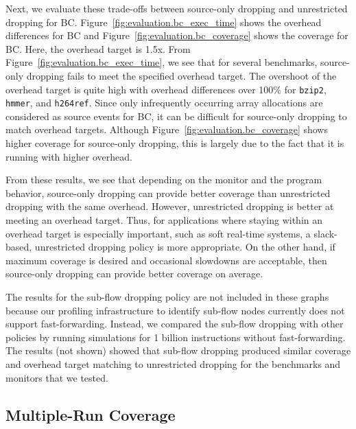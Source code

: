 Next, we evaluate these trade-offs between source-only dropping and unrestricted dropping for BC.
Figure~\ref{fig:evaluation.bc_exec_time} shows the overhead differences for BC
and Figure~\ref{fig:evaluation.bc_coverage} shows the coverage for BC.
Here, the overhead target is 1.5x.
From Figure~\ref{fig:evaluation.bc_exec_time}, we see that for several
benchmarks, source-only dropping fails to meet the specified overhead target.
The overshoot of the overhead target is quite high with overhead differences over 100\% for {\tt bzip2}, {\tt hmmer}, and {\tt h264ref}.
Since only infrequently occurring array allocations are considered as source events for BC, it can be 
difficult for source-only dropping to match overhead targets. Although
Figure~\ref{fig:evaluation.bc_coverage} shows higher coverage for
source-only dropping, this is largely due to the fact that it is running with
higher overhead.

From these results, we see that depending on the monitor and the program
behavior, source-only dropping can provide better coverage than unrestricted
dropping with the same overhead. However, unrestricted dropping is better at
meeting an overhead target.
Thus, for applications where staying within an overhead target is especially
important, such as soft real-time systems, a slack-based, unrestricted dropping
policy is more appropriate. On the other hand, if maximum coverage is desired
and occasional slowdowns are acceptable, then source-only dropping can provide
better coverage on average.

The results for the sub-flow dropping policy are not included in these graphs
because our profiling infrastructure to identify sub-flow nodes currently does
not support fast-forwarding. Instead, we compared the sub-flow dropping with
other policies by running simulations for 1 billion instructions without
fast-forwarding. The results (not shown) showed that sub-flow dropping produced
similar coverage and overhead target matching to unrestricted dropping for the
benchmarks and monitors that we tested.

\subsection{Multiple-Run Coverage}

